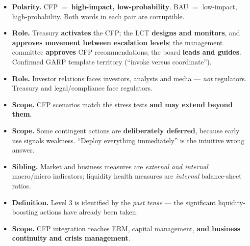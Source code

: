 \begin{lrtrapboxnb}
\begin{itemize}
\item \textbf{Polarity.} CFP $=$ \textbf{high-impact, low-probability}. BAU $=$ low-impact, high-probability. Both words in each pair are corruptible.
\item \textbf{Role.} Treasury \textbf{activates} the CFP; the LCT \textbf{designs and monitors}, and \textbf{approves movement between escalation levels}; the management committee \textbf{approves} CFP recommendations; the board \textbf{leads and guides}. Confirmed GARP template territory (``invoke versus coordinate'').
\item \textbf{Role.} Investor relations faces investors, analysts and media --- \emph{not} regulators. Treasury and legal/compliance face regulators.
\item \textbf{Scope.} CFP scenarios match the stress tests \textbf{and may extend beyond them}.
\item \textbf{Scope.} Some contingent actions are \textbf{deliberately deferred}, because early use signals weakness. ``Deploy everything immediately'' is the intuitive wrong answer.
\item \textbf{Sibling.} Market and business measures are \emph{external and internal} macro/micro indicators; liquidity health measures are \emph{internal} balance-sheet ratios.
\item \textbf{Definition.} Level 3 is identified by the \emph{past tense} --- the significant liquidity-boosting actions have already been taken.
\item \textbf{Scope.} CFP integration reaches ERM, capital management, \textbf{and business continuity and crisis management}.
\end{itemize}
\end{lrtrapboxnb}
